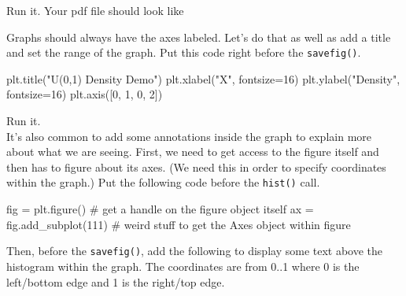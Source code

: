 \begin{fullwidth}
\step Run it. Your pdf file should look like


\step  Graphs should always have the axes labeled. Let's do that as well as add a title and set the range of the graph. Put this code right before the {\tt savefig()}.

\begin{pyverbatim}
plt.title("U(0,1) Density Demo")
plt.xlabel("X", fontsize=16)
plt.ylabel("Density", fontsize=16)
plt.axis([0, 1, 0, 2])
\end{pyverbatim}

\step Run it. \\

\step It's also common to add some annotations inside the graph to explain more about what we are seeing. First, we need to get access to the figure itself and then has to figure about its axes. (We need this in order to specify coordinates within the graph.) Put the following code before the {\tt hist()} call.

\begin{pyverbatim}
fig = plt.figure()        # get a handle on the figure object itself
ax = fig.add_subplot(111) # weird stuff to get the Axes object within figure
\end{pyverbatim}

Then, before the {\tt savefig()},  add the following to display some text above the histogram within the graph. The coordinates are from 0..1 where 0 is the left/bottom edge and 1 is the right/top edge.


\end{fullwidth}

